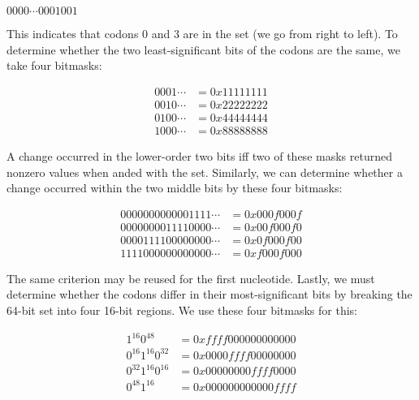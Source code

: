 \documentclass{article}
\begin{document}
      \begin{center}
        $0000 \cdots 0001001$
      \end{center}

      \noindent This indicates that codons 0 and 3 are in the set (we go from
	  right to left). To determine whether the two least-significant bits
      of the codons are the same, we take four bitmasks:

      \begin{align*}
        0001 \cdots & = 0x11111111 \\ %
        0010 \cdots & = 0x22222222 \\ %
        0100 \cdots & = 0x44444444 \\ %
        1000 \cdots & = 0x88888888
      \end{align*}

      A change occurred in the lower-order two bits iff two of these masks
      returned nonzero values when anded with the set. Similarly, we can
      determine whether a change occurred within the two middle bits by these
      four bitmasks:

      \begin{align*}
        0000000000001111 \cdots & = 0x000f000f \\ %
        0000000011110000 \cdots & = 0x00f000f0 \\ %
        0000111100000000 \cdots & = 0x0f000f00 \\ %
        1111000000000000 \cdots & = 0xf000f000
      \end{align*}

      The same criterion may be reused for the first nucleotide. Lastly, we must
      determine whether the codons differ in their most-significant bits by
      breaking the 64-bit set into four 16-bit regions. We use these four
      bitmasks for this:

      \begin{align*}
	1^{16}0^{48} 		& = 0xffff000000000000 \\ %
	0^{16}1^{16}0^{32}	& = 0x0000ffff00000000 \\ %
	0^{32}1^{16}0^{16}	& = 0x00000000ffff0000 \\ %
	0^{48}1^{16}		& = 0x000000000000ffff
      \end{align*}
\end{document}

